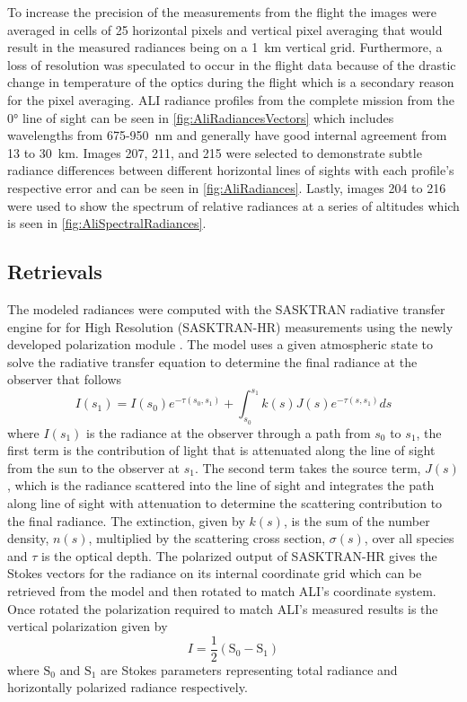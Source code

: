 \documentclass[12pt]{article}
\begin{document}
To increase the precision of the measurements from the flight the images were averaged in cells of 25 horizontal pixels and vertical pixel averaging that would result in the measured radiances being on a 1~km vertical grid. Furthermore, a loss of resolution was speculated to occur in the flight data because of the drastic change in temperature of the optics during the flight which is a secondary reason for the pixel averaging. ALI radiance profiles from the complete mission from the 0\si{\degree} line of sight can be seen in \autoref{fig:AliRadiancesVectors} which includes wavelengths from 675-950~nm and generally have good internal agreement from 13 to 30~km. Images 207, 211, and 215 were selected to demonstrate subtle radiance differences between different horizontal lines of sights with each profile's respective error and can be seen in \autoref{fig:AliRadiances}. Lastly, images 204 to 216 were used to show the spectrum of relative radiances at a series of altitudes which is seen in \autoref{fig:AliSpectralRadiances}.

\subsection{Retrievals}
\label{sec:retrievals}

The modeled radiances were computed with the SASKTRAN radiative transfer engine \citep{Bourassa2008a} for for High Resolution (SASKTRAN-HR) \citep{Zawada2015} measurements using the newly developed polarization module \citep{Dueck2015}. The model uses a given atmospheric state to solve the radiative transfer equation to determine the final radiance at the observer that follows
\begin{equation}
    I(s_{1}) = I(s_{0})e^{-\tau(s_{0}, s_{1})}+\int^{s_{1}}_{s_{0}}k(s)J(s)e^{-\tau(s, s_{1})}ds
\end{equation}
where $I(s_{1})$ is the radiance at the observer through a path from $s_{0}$ to $s_{1}$, the first term is the contribution of light that is attenuated along the line of sight from the sun to the observer at $s_{1}$. The second term takes the source term, $J(s)$, which is the radiance scattered into the line of sight and integrates the path along line of sight with attenuation to determine the scattering contribution to the final radiance. The extinction, given by $k(s)$, is the sum of the number density, $n(s)$, multiplied by the scattering cross section, $\sigma(s)$, over all species and $\tau$ is the optical depth. The polarized output of SASKTRAN-HR gives the Stokes vectors for the radiance on its internal coordinate grid which can be retrieved from the model and then rotated to match ALI's coordinate system. Once rotated the polarization required to match ALI's measured results is the vertical polarization given by
\begin{equation}
    I = \frac{1}{2}\left(\mathrm{S_{0}}-\mathrm{S_{1}}\right)
\end{equation}
where $\mathrm{S_{0}}$ and $\mathrm{S_{1}}$ are Stokes parameters representing total radiance and horizontally polarized radiance respectively.
\end{document}
